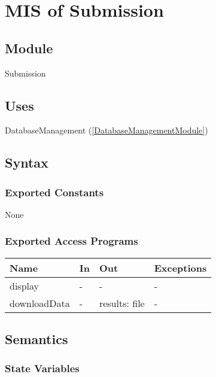 \documentclass[12pt, titlepage]{article}
\begin{document}
\newpage

\section{MIS of Submission} \label{SubmissionModule}

\subsection{Module}

Submission

\subsection{Uses}

DatabaseManagement (\ref{DatabaseManagementModule})

\subsection{Syntax}

\subsubsection{Exported Constants}

None

\subsubsection{Exported Access Programs}

\begin{center}
\begin{tabular}{p{3cm} p{3cm} p{4cm} p{2cm}}
\hline
\textbf{Name} & \textbf{In} & \textbf{Out} & \textbf{Exceptions} \\
\hline
display & - & - & - \\
downloadData & - & results: file & - \\
\hline
\end{tabular}
\end{center}

\subsection{Semantics}

\subsubsection{State Variables}
\end{document}
